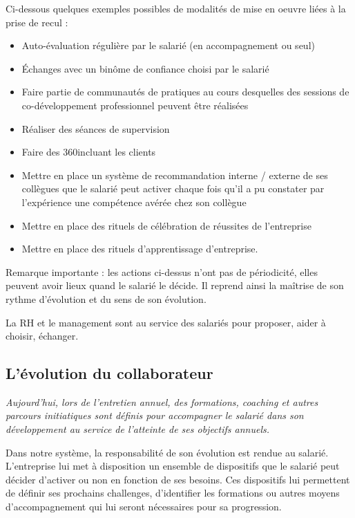 \documentclass[12pt]{article}
\newcommand{\actuel}[1]{%
  \begin{tcolorbox}[colframe=DarkButter,boxrule=2pt,arc=4pt,left=6pt,right=6pt,top=6pt,bottom=6pt,boxsep=0pt,colback=Aluminium2]
    \textit{#1}
  \end{tcolorbox}
}
\begin{document}
 Ci-dessous quelques exemples possibles de modalités de mise en oeuvre liées à la prise de recul :
 \begin{itemize}
   \item Auto-évaluation régulière par le salarié (en accompagnement ou seul)
   \item Échanges avec un binôme de confiance choisi par le salarié
   \item Faire partie de communautés de pratiques au cours desquelles des sessions de co-développement professionnel peuvent être réalisées
   \item Réaliser des séances de supervision
   \item Faire des 360\degre incluant les clients
   \item Mettre en place un système de recommandation interne / externe de ses collègues que le salarié peut activer chaque fois qu’il a pu constater par l’expérience une compétence avérée chez son collègue
   \item Mettre en place des rituels de célébration de réussites de l’entreprise
   \item Mettre en place des rituels d’apprentissage d’entreprise.
 \end{itemize}

 Remarque importante : les actions ci-dessus n’ont pas de périodicité, elles peuvent avoir lieux quand le salarié le décide. Il reprend ainsi la maîtrise de son rythme d’évolution et du sens de son évolution.

 La RH et le management sont au service des salariés pour proposer, aider à choisir, échanger. 

\subsection{L’évolution du collaborateur}
 \actuel{Aujourd’hui, lors de l’entretien annuel, des formations, coaching et autres parcours initiatiques sont définis pour accompagner le salarié dans son développement au service de l’atteinte de ses objectifs annuels.}

 Dans notre système, la responsabilité de son évolution est rendue au salarié. L’entreprise lui met à disposition un ensemble de dispositifs que le salarié peut décider d’activer ou non en fonction de ses besoins. Ces dispositifs lui permettent de définir ses prochains challenges, d’identifier les formations ou autres moyens d'accompagnement qui lui seront nécessaires pour sa progression.
\end{document}
